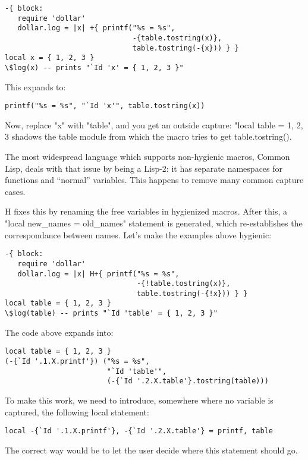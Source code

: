 \begin{Verbatim}
-{ block:
   require 'dollar'
   dollar.log = |x| +{ printf("%s = %s", 
                              -{table.tostring(x)}, 
                              table.tostring(-{x})) } }
local x = { 1, 2, 3 }
\$log(x) -- prints "`Id 'x' = { 1, 2, 3 }"
\end{Verbatim}

This expands to:
\begin{Verbatim}
printf("%s = %s", "`Id 'x'", table.tostring(x))
\end{Verbatim}

Now, replace "x" with "table", and you get an outside capture: "local
table = { 1, 2, 3 } shadows the table module from which the macro
tries to get table.tostring().

The most widespread language which supports non-hygienic macros,
Common Lisp, deals with that issue by being a Lisp-2: it has separate
namespaces for functions and ``normal'' variables. This happens to
remove many common capture cases. 

H fixes this by renaming the free variables in hygienized
macros. After this, a "local new\_names = old\_names" statement is
generated, which re-establishes the correspondance between
names. Let's make the examples above hygienic:

\begin{Verbatim}
-{ block:
   require 'dollar'
   dollar.log = |x| H+{ printf("%s = %s", 
                               -{!table.tostring(x)}, 
                               table.tostring(-{!x})) } }
local table = { 1, 2, 3 }
\$log(table) -- prints "`Id 'table' = { 1, 2, 3 }"
\end{Verbatim}

The code above expands into:

\begin{Verbatim}
local table = { 1, 2, 3 }
(-{`Id '.1.X.printf'}) ("%s = %s",
                        "`Id 'table'",
                        (-{`Id '.2.X.table'}.tostring(table)))
\end{Verbatim}

To make this work, we need to introduce, somewhere where no variable
is captured, the following local statement:
\begin{Verbatim}
local -{`Id '.1.X.printf'}, -{`Id '.2.X.table'} = printf, table
\end{Verbatim}

The correct way would be to let the user decide where this statement
should go.

